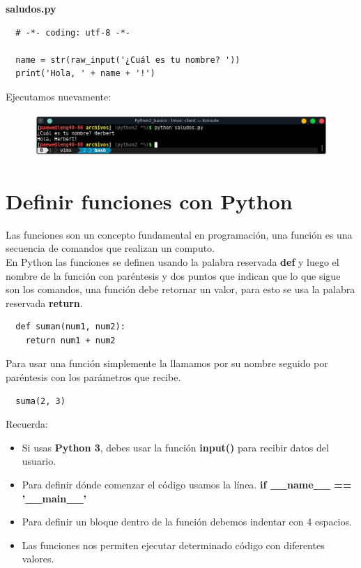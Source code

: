 \documentclass{article}
\begin{document}
\textbf{saludos.py}
\begin{verbatim}
  # -*- coding: utf-8 -*-

  name = str(raw_input('¿Cuál es tu nombre? '))
  print('Hola, ' + name + '!')
\end{verbatim}

Ejecutamos nuevamente:

\begin{figure}[h!]
  \centering
  \includegraphics[scale=0.75]{./Pictures/018_saludos_exito.png}
\end{figure}

\newpage

\section{Definir funciones con Python}%
Las funciones son un concepto fundamental en programación, una función es una
secuencia de comandos que realizan un computo.\\

En Python las funciones se definen usando la palabra reservada \textbf{def} y
luego el nombre de la función con paréntesis y dos puntos que indican que lo
que sigue son los comandos, una función debe retornar un valor, para esto se
usa la palabra reservada \textbf{return}.

\begin{verbatim}
  def suman(num1, num2):
    return num1 + num2
\end{verbatim}

Para usar una función simplemente la llamamos por su nombre seguido por
paréntesis con los parámetros que recibe.

\begin{verbatim}
  suma(2, 3)
\end{verbatim}

Recuerda:
\begin{itemize}
  \item Si usas \textbf{Python 3}, debes usar la función \textbf{input()} para
    recibir datos del usuario.
  \item Para definir dónde comenzar el código usamos la línea. \textbf{if
    \_\_name\_\_ == '\_\_main\_\_'}
  \item Para definir un bloque dentro de la función debemos indentar con 4
    espacios.
  \item Las funciones nos permiten ejecutar determinado código con diferentes
    valores.
\end{itemize}
\end{document}
